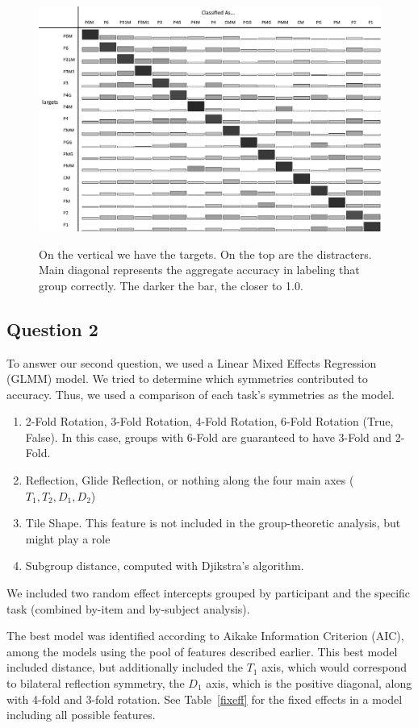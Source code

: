 \begin{figure}[!ht]
\centering
\includegraphics[width=0.9\columnwidth]{accuracies-grayscale}
\label{fullacc}
\caption{On the vertical we have the targets. On the top are the distracters. Main diagonal represents the aggregate accuracy in labeling that group correctly. The darker the bar, the closer to 1.0.}
\end{figure}

\subsection{Question 2}
To answer our second question, we used a Linear Mixed Effects Regression (GLMM) model. We tried to determine which symmetries contributed to accuracy. Thus, we used a comparison of each task's symmetries as the model.
\begin{enumerate}
\item 2-Fold Rotation, 3-Fold Rotation, 4-Fold Rotation, 6-Fold Rotation (True, False). In this case, groups with 6-Fold are guaranteed to have 3-Fold and 2-Fold.
\item Reflection, Glide Reflection, or nothing along the four main axes ($T_1, T_2, D_1, D_2$)
\item Tile Shape. This feature is not included in the group-theoretic analysis, but might play a role
\item Subgroup distance, computed with Djikstra's algorithm. 
\end{enumerate}

We included two random effect intercepts grouped by participant and the specific task (combined by-item and by-subject analysis).


The best model was identified according to Aikake Information Criterion (AIC), among the models using the pool of features described earlier. This best model included distance, but additionally included the $T_1$ axis, which would correspond to bilateral reflection symmetry, the $D_1$ axis, which is the positive diagonal, along with 4-fold and 3-fold rotation. See Table~\ref{fixeff} for the fixed effects in a model including all possible features.